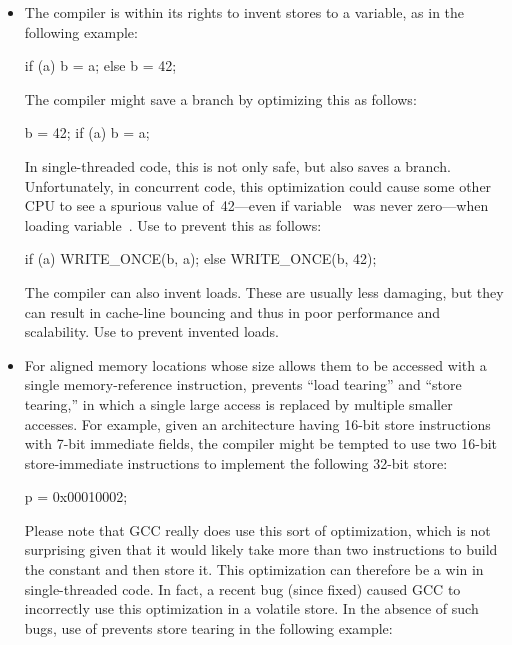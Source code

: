 \begin{itemize}
 \item
     The compiler is within its rights to invent stores to a variable,
     as in the following example:

\begin{VerbatimU}
	if (a)
		b = a;
	else
		b = 42;
\end{VerbatimU}

     The compiler might save a branch by optimizing this as follows:

\begin{VerbatimU}
	b = 42;
	if (a)
		b = a;
\end{VerbatimU}

     In single-threaded code, this is not only safe, but also saves
     a branch.
     Unfortunately, in concurrent code, this optimization could cause
     some other CPU to see a spurious value of~42---even if variable~
     was never zero---when loading variable~.
     Use  to prevent this as follows:

\begin{VerbatimU}
	if (a)
		WRITE_ONCE(b, a);
	else
		WRITE_ONCE(b, 42);
\end{VerbatimU}

     The compiler can also invent loads.
     These are usually less damaging, but they can result in cache-line
     bouncing and thus in poor performance and scalability.
     Use  to prevent invented loads.

 \item
     For aligned memory locations whose size allows them to be accessed
     with a single memory-reference instruction, prevents ``load tearing''
     and ``store tearing,'' in which a single large access is replaced by
     multiple smaller accesses.
     For example, given an architecture having 16-bit store instructions
     with 7-bit immediate fields, the compiler might be tempted to use
     two 16-bit store-immediate instructions to implement the following
     32-bit store:

\begin{VerbatimU}
	p = 0x00010002;
\end{VerbatimU}

     Please note that GCC really does use this sort of optimization,
     which is not surprising given that it would likely take more
     than two instructions to build the constant and then store it.
     This optimization can therefore be a win in single-threaded code.
     In fact, a recent bug (since fixed) caused GCC to incorrectly use
     this optimization in a volatile store.
     In the absence of such bugs, use of  prevents
     store tearing in the following example:


\end{itemize}
